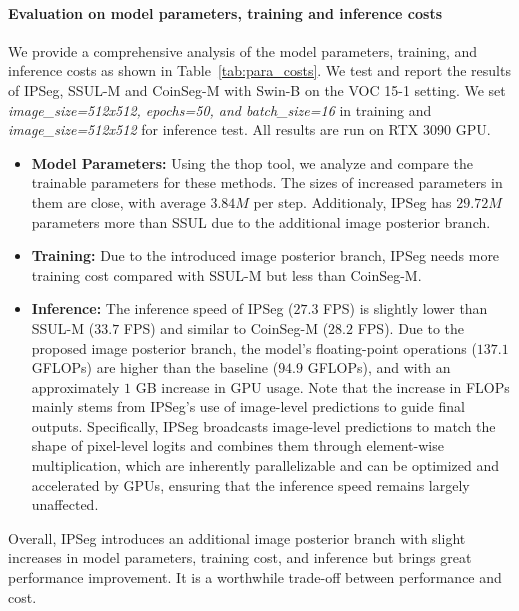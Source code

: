 \paragraph{Evaluation on model parameters, training and inference costs} We provide a comprehensive analysis of the model parameters, training, and inference costs as shown in Table~\ref{tab:para_costs}. We test and report the results of IPSeg, SSUL-M and CoinSeg-M with Swin-B on the VOC 15-1 setting. We set \textit{image\_size=512x512, epochs=50, and batch\_size=16} in training and \textit{image\_size=512x512} for inference test. All results are run on RTX 3090 GPU.
\begin{itemize}
    \item \textbf{Model Parameters:} Using the thop tool, we analyze and compare the trainable parameters for these methods. The sizes of increased parameters in them are close, with average $3.84M$ per step. Additionaly, IPSeg has $29.72M$ parameters more than SSUL due to the additional image posterior branch.
    \item \textbf{Training:} Due to the introduced image posterior branch, IPSeg needs more training cost compared with SSUL-M but  less than CoinSeg-M. 
    \item \textbf{Inference:} The inference speed of IPSeg ($27.3$ FPS) is slightly lower than SSUL-M ($33.7$ FPS) and similar to CoinSeg-M ($28.2$ FPS). Due to the proposed image posterior branch, the model's floating-point operations ($137.1$ GFLOPs) are higher than the baseline ($94.9$ GFLOPs), and with an approximately $1$ GB increase in GPU usage. Note that the increase in FLOPs mainly stems from IPSeg’s use of image-level predictions to guide final outputs. Specifically, IPSeg broadcasts image-level predictions to match the shape of pixel-level logits and combines them through element-wise multiplication, which are inherently parallelizable and can be optimized and accelerated by GPUs, ensuring that the inference speed remains largely unaffected.
\end{itemize}

Overall, IPSeg introduces an additional image posterior branch with slight increases in model parameters, training cost, and inference but brings great performance improvement. It is a worthwhile trade-off between performance and cost.


